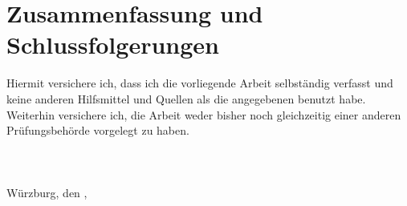 \documentclass[a4paper]{scrreprt}
\theoremstyle{definition}
\begin{document}
\chapter{Zusammenfassung und Schlussfolgerungen}
\label{chap:outro}









\newpage

Hiermit versichere ich, dass ich die vorliegende Arbeit selbständig verfasst und keine
anderen Hilfsmittel und Quellen als die angegebenen benutzt habe. Weiterhin versichere
ich, die Arbeit weder bisher noch gleichzeitig einer anderen Prüfungsbehörde vorgelegt
zu haben.
\\ \\ \\ \\
Würzburg, den \makebox[3cm]{\hrulefill},  \hspace{.5cm} \makebox[7cm]{\hrulefill}\\
\end{document}

